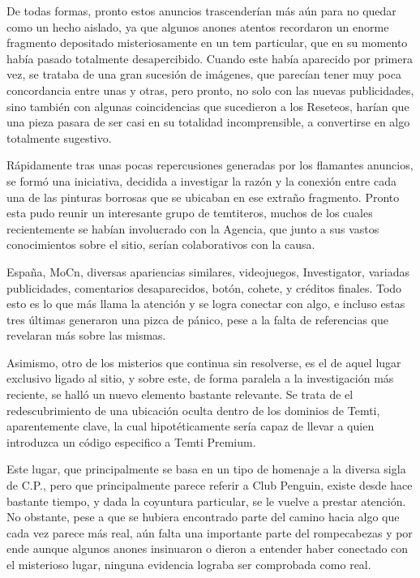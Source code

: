 \documentclass[
]{book}
\begin{document}
De todas formas, pronto estos anuncios trascenderían más aún para no quedar como un hecho aislado, ya que algunos anones atentos recordaron un enorme fragmento depositado misteriosamente en un tem particular, que en su momento había pasado totalmente desapercibido. Cuando este había aparecido por primera vez, se trataba de una gran sucesión de imágenes, que parecían tener muy poca concordancia entre unas y otras, pero pronto, no solo con las nuevas publicidades, sino también con algunas coincidencias que sucedieron a los Reseteos, harían que una pieza pasara de ser casi en su totalidad incomprensible, a convertirse en algo totalmente sugestivo.

Rápidamente tras unas pocas repercusiones generadas por los flamantes anuncios, se formó una iniciativa, decidida a investigar la razón y la conexión entre cada una de las pinturas borrosas que se ubicaban en ese extraño fragmento. Pronto esta pudo reunir un interesante grupo de temtiteros, muchos de los cuales recientemente se habían involucrado con la Agencia, que junto a sus vastos conocimientos sobre el sitio, serían colaborativos con la causa.

España, MoCn, diversas apariencias similares, videojuegos, Investigator, variadas publicidades, comentarios desaparecidos, botón, cohete, y créditos finales. Todo esto es lo que más llama la atención y se logra conectar con algo, e incluso estas tres últimas generaron una pizca de pánico, pese a la falta de referencias que revelaran más sobre las mismas.

Asimismo, otro de los misterios que continua sin resolverse, es el de aquel lugar exclusivo ligado al sitio, y sobre este, de forma paralela a la investigación más reciente, se halló un nuevo elemento bastante relevante. Se trata de el redescubrimiento de una ubicación oculta dentro de los dominios de Temti, aparentemente clave, la cual hipotéticamente sería capaz de llevar a quien introduzca un código especifico a Temti Premium.

Este lugar, que principalmente se basa en un tipo de homenaje a la diversa sigla de C.P., pero que principalmente parece referir a Club Penguin, existe desde hace bastante tiempo, y dada la coyuntura particular, se le vuelve a prestar atención. No obstante, pese a que se hubiera encontrado parte del camino hacia algo que cada vez parece más real, aún falta una importante parte del rompecabezas y por ende aunque algunos anones insinuaron o dieron a entender haber conectado con el misterioso lugar, ninguna evidencia lograba ser comprobada como real.
\end{document}
